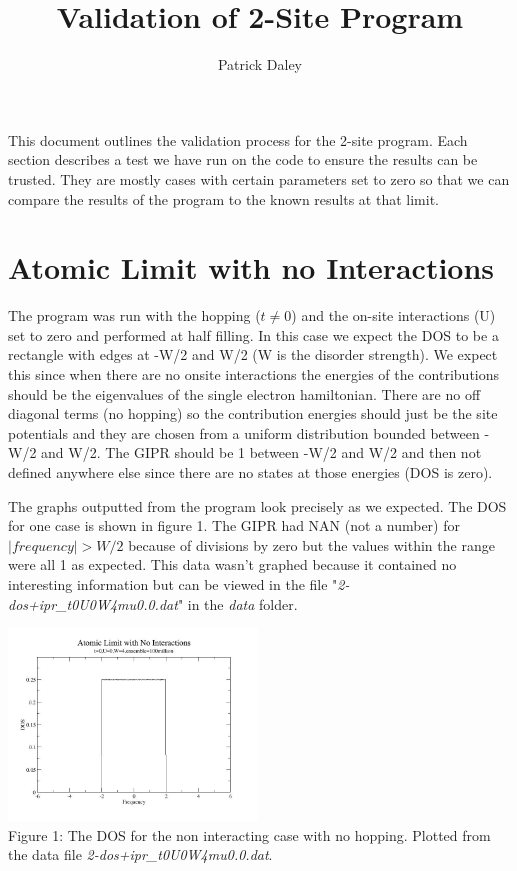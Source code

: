 \documentclass{article}
\author{Patrick Daley}
\title{Validation of 2-Site Program}
\begin{document}
\maketitle

This document outlines the validation process for the 2-site program. Each section describes a test we have run on the code to ensure the results can be trusted. They are mostly cases with certain parameters set to zero so that we can compare the results of the program to the known results at that limit. 

\section{Atomic Limit with no Interactions}
The program was run with the hopping ($t\ne0$) and the on-site interactions (U) set to zero and performed at half filling. In this case we expect the DOS to be a rectangle with edges at -W/2 and W/2 (W is the disorder strength). We expect this since when there are no onsite interactions the energies of the contributions should be the eigenvalues of the single electron hamiltonian. There are no off diagonal terms (no hopping) so the contribution energies should just be the site potentials and they are chosen from a uniform distribution bounded between -W/2 and W/2. The GIPR should be 1 between -W/2 and W/2 and then not defined anywhere else since there are no states at those energies (DOS is zero).

The graphs outputted from the program look precisely as we expected.  The DOS for one case is shown in figure 1. The GIPR had NAN (not a number) for $ | frequency | > W/2 $ because of divisions by zero but the values within the range were all 1 as expected. This data wasn't graphed because it contained no interesting information but can be viewed in the file "\textit{2-dos+ipr\_t0U0W4mu0.0.dat}" in the \textit{data} folder.

\begin{center}
	\includegraphics[width=250px]{dos2_t0u0w4.jpg} \\
	Figure 1: The DOS for the non interacting case with no hopping. Plotted from the data file \textit{2-dos+ipr\_t0U0W4mu0.0.dat}.
\end{center}
\end{document}
